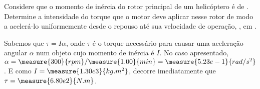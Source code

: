 \begin{question}
    Considere que o momento de inércia do rotor principal de um helicóptero é de .
    Determine a intensidade do torque que o motor deve aplicar nesse rotor de modo a acelerá-lo uniformemente desde o repouso até sua velocidade de operação, , em .
    \begin{answer}
    \end{answer}
    
    \begin{solution}
      Sabemos que $\tau = I\alpha$, onde $\tau$ é o torque necessário para causar uma aceleração angular $\alpha$ num objeto cujo momento de inércia é $I$.
      No caso apresentado, $\alpha = \measure{300}{rpm}/\measure{1.00}{min} = \measure{5.23e-1}{rad/s^2}$.
      E como $I = \measure{1.30e3}{kg.m^2}$, decorre imediatamente que $\tau = \measure{6.80e2}{N.m}$.
    \end{solution}
\end{question}